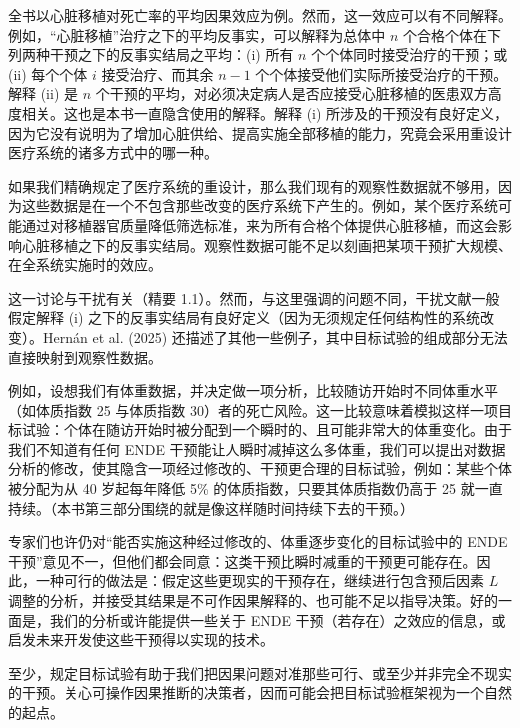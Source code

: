 \renewcommand{\FPname}{精要（Fine Point）}
\begin{finepoint}[目标试验模拟的一些局限]
全书以心脏移植对死亡率的平均因果效应为例。然而，这一效应可以有不同解释。例如，“心脏移植”治疗之下的平均反事实，可以解释为总体中 $n$ 个合格个体在下列两种干预之下的反事实结局之平均：(i) 所有 $n$ 个个体同时接受治疗的干预；或 (ii) 每个个体 $i$ 接受治疗、而其余 $n-1$ 个个体接受他们实际所接受治疗的干预。解释 (ii) 是 $n$ 个干预的平均，对必须决定病人是否应接受心脏移植的医患双方高度相关。这也是本书一直隐含使用的解释。解释 (i) 所涉及的干预没有良好定义，因为它没有说明为了增加心脏供给、提高实施全部移植的能力，究竟会采用重设计医疗系统的诸多方式中的哪一种。

如果我们精确规定了医疗系统的重设计，那么我们现有的观察性数据就不够用，因为这些数据是在一个不包含那些改变的医疗系统下产生的。例如，某个医疗系统可能通过对移植器官质量降低筛选标准，来为所有合格个体提供心脏移植，而这会影响心脏移植之下的反事实结局。观察性数据可能不足以刻画把某项干预扩大规模、在全系统实施时的效应。

这一讨论与干扰有关（精要 1.1）。然而，与这里强调的问题不同，干扰文献一般假定解释 (i) 之下的反事实结局有良好定义（因为无须规定任何结构性的系统改变）。Hernán et al. (2025) 还描述了其他一些例子，其中目标试验的组成部分无法直接映射到观察性数据。
\end{finepoint}
\renewcommand{\FPname}{精要}

例如，设想我们有体重数据，并决定做一项分析，比较随访开始时不同体重水平（如体质指数 25 与体质指数 30）者的死亡风险。这一比较意味着模拟这样一项目标试验：个体在随访开始时被分配到一个瞬时的、且可能非常大的体重变化。由于我们不知道有任何 ENDE 干预能让人瞬时减掉这么多体重，我们可以提出对数据分析的修改，使其隐含一项经过修改的、干预更合理的目标试验，例如：某些个体被分配为从 40 岁起每年降低 5\% 的体质指数，只要其体质指数仍高于 25 就一直持续。（本书第三部分围绕的就是像这样随时间持续下去的干预。）

专家们也许仍对“能否实施这种经过修改的、体重逐步变化的目标试验中的 ENDE 干预”意见不一，但他们都会同意：这类干预比瞬时减重的干预更可能存在。因此，一种可行的做法是：假定这些更现实的干预存在，继续进行包含预后因素 $L$ 调整的分析，并接受其结果是不可作因果解释的、也可能不足以指导决策。好的一面是，我们的分析或许能提供一些关于 ENDE 干预（若存在）之效应的信息，或启发未来开发使这些干预得以实现的技术。


至少，规定目标试验有助于我们把因果问题对准那些可行、或至少并非完全不现实的干预。关心可操作因果推断的决策者，因而可能会把目标试验框架视为一个自然的起点。

